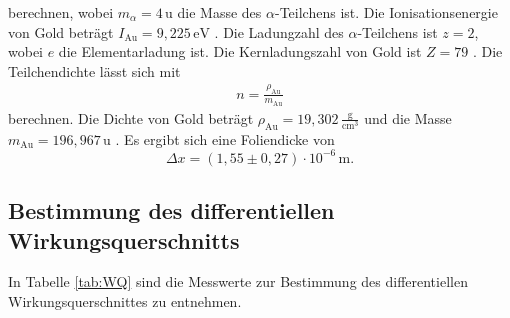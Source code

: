 berechnen, wobei $m_{\alpha} = 4\,\text{u}$ \cite{chem} die Masse des $\alpha$-Teilchens ist.
Die Ionisationsenergie von Gold beträgt $I_{\text{Au}} = 9,225\,\text{eV}$ \cite{PSE}.
Die Ladungzahl des $\alpha$-Teilchens ist $z = 2$, wobei $e$ die Elementarladung ist.
Die Kernladungszahl von Gold ist $Z = 79$ \cite{PSE}.
Die Teilchendichte lässt sich mit
\begin{align*}
  n = \frac{\rho_{\text{Au}}}{m_{\text{Au}}}
\end{align*}
berechnen.
Die Dichte von Gold beträgt $\rho_{\text{Au}} = 19,302\,\frac{\text{g}}{\text{cm}^3}$ \cite{PSE} und die Masse $m_{\text{Au}} = 196,967\,\text{u}$ \cite{PSE}.
Es ergibt sich eine Foliendicke von
\begin{equation*}
  \Delta{x} = (1,55\pm0,27)\cdot10^{-6}\,\text{m}.
\end{equation*}

\subsection{Bestimmung des differentiellen Wirkungsquerschnitts}
In Tabelle \ref{tab:WQ} sind die Messwerte zur Bestimmung des differentiellen Wirkungsquerschnittes zu entnehmen.

